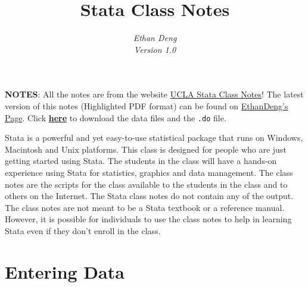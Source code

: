 \documentclass{article}
\title{\bfseries{\color{blue}Stata} {\color{magenta}Class Notes}}
\author{\Large\gara\itshape{{\color{blue}E}than {\color{magenta}D}eng} \\ Version 1.0}
\begin{document}
\maketitle
\noindent\textbf{NOTES}: All the notes are from the website \href{http://www.ats.ucla.edu/stat/stata/notes/default13.htm}{UCLA Stata Class Notes}! The latest version of this notes (Highlighted PDF format) can be found on \href{http://ddswhu.com/}{EthanDeng\rq{}s Page}. Click \href{http://stack.ddswhu.com/Stata/Stata_class_notes/data.zip}{\textbf{here}} to download the data files and the \lstinline{.do} file.

Stata is a powerful and yet easy-to-use statistical package that runs on Windows, Macintosh and Unix platforms.  This class is designed for people who are just getting started using Stata.  The students in the class will have a hands-on experience using Stata for statistics, graphics and data management.  The class notes are the scripts for the class available to the students in the class and to others on the Internet.  The Stata class notes do not contain any of the output.  The class notes are not meant to be a Stata textbook or a reference manual.  However, it is possible for individuals to use the class notes to help in learning Stata even if they don't enroll in the class.

\section{Entering Data}
\end{document}
